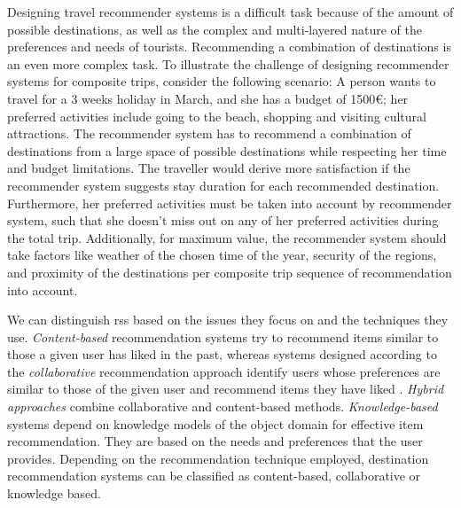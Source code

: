 Designing travel recommender systems is a difficult task because of the amount of possible destinations, as well as the complex
and multi-layered nature of the preferences and needs of tourists. Recommending a combination of destinations is an even more complex task. To illustrate the challenge of designing recommender systems for composite trips, consider the following scenario: A person wants to travel for a 3 weeks holiday in March, and she has a budget of 1500€; her preferred activities include going to the beach, shopping and visiting cultural attractions. The recommender system has to recommend a combination of destinations from a large space of possible destinations while respecting her time and budget limitations. The traveller would derive more satisfaction if the recommender system suggests stay duration for each recommended destination. Furthermore, her preferred activities must be taken into account by recommender system, such that she doesn't miss out on any of her preferred activities during the total trip. Additionally, for maximum value, the recommender system should take factors like weather of the chosen time of the year, security of the regions, and proximity of the destinations per composite trip sequence of recommendation into account. 


We can distinguish \Glspl{rs}  based on the issues they focus on and the techniques they use.
\textit{Content-based} recommendation systems try to recommend items similar to those a given user has liked in the past, whereas systems
designed according to the \textit{collaborative} recommendation approach identify users
whose preferences are similar to those of the given user and recommend items they
have liked \parencite{Balabanovic1997Content-BasedRecommendation}. \textit{Hybrid approaches} \parencite{Adomavicius2005TowardExtensions} combine collaborative and content-based methods. \textit{Knowledge-based} systems \parencite{Burke2000Knowledge-basedSystems} depend on knowledge models of the object domain for effective item recommendation. They are based on the needs and preferences that the user provides. Depending on the recommendation technique employed, destination recommendation systems can be classified as content-based, collaborative or knowledge based.

